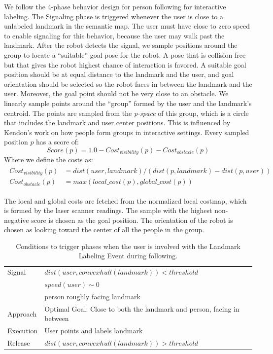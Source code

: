 \documentclass[3p]{elsarticle}
\begin{document}
We follow the 4-phase behavior design for person following for interactive labeling. The Signaling phase is triggered whenever the user is close to a unlabeled landmark in the semantic map. The user must have close to zero speed to enable signaling for this behavior, because the user may walk past the landmark. After the robot detects the signal, we sample positions around the group to locate a ``suitable'' goal pose for the robot. A pose that is collision free but that gives the robot highest chance of interaction is favored. A suitable goal position should be at equal distance to the landmark and the user, and goal orientation should be selected so the robot faces in between the landmark and the user. Moreover, the goal point should not be very close to an obstacle. We linearly sample points around the ``group'' formed by the user and the landmark's centroid. The points are sampled from the \textit{p-space} of this group, which is a circle that includes the landmark and user center positions. This is influenced by Kendon's work \cite{kendon1990conducting} on how people form groups in interactive settings. Every sampled position $p$ has a score of:
\[
Score(p) = 1.0 - Cost_{visibility}(p) - Cost_{obstacle}(p)
\]
Where we define the costs as:
\begin{align} 
\begin{split}
Cost_{visibility}(p)&=dist(user,landmark)/(dist(p,landmark)-dist(p,user)) \\
Cost_{obstacle}(p)&=max(local\_cost(p),global\_cost(p))
\end{split}
\end{align}

The local and global costs are fetched from the normalized local costmap, which is formed by the laser scanner readings. The sample with the highest non-negative score is chosen as the goal position. The orientation of the robot is chosen as looking toward the center of all the people in the group. 

\begin{table}[ht!]

	
    \centering
		
  \begin{tabular}{l |  m{10cm}}
    \toprule    
    Signal & {$dist(user, convex hull(landmark))<threshold$}\\       
	                           & {$speed(user)\sim 0$} \\
	                           & {person roughly facing landmark}\\ \midrule		                           		                                
    Approach & {Optimal Goal: Close to both the landmark and person, facing in between}\\       \midrule
    Execution & {User points and labels landmark}\\  \midrule
    Release & {$dist(user, convex hull(landmark))>threshold$}\\ 
    \bottomrule
  \end{tabular}
	\caption{Conditions to trigger phases when the user is involved with the Landmark Labeling Event during following.}    
    \label{table:situation_aware_list_landmark}
\end{table}
\end{document}
